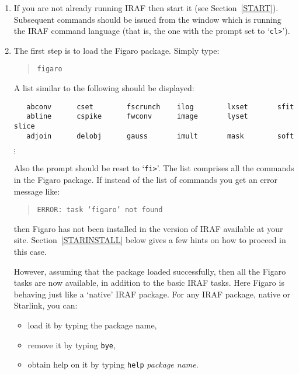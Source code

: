 \documentclass[twoside,11pt]{article}
\begin{document}
\begin{enumerate}

  \item If you are not already running IRAF then start it (see
   Section~\ref{START}).  Subsequent commands should be issued from
   the window which is running the IRAF command language (that is, the
   one with the prompt set to `\verb-cl>-').

  \item The first step is to load the Figaro package.  Simply type:

  \begin{quote}
   {\tt figaro}
  \end{quote}

   A list similar to the following should be displayed:

  \begin{center}
  \begin{verbatim}
   abconv      cset        fscrunch    ilog        lxset       sfit
   abline      cspike      fwconv      image       lyset       slice
   adjoin      delobj      gauss       imult       mask        soft
\end{verbatim}$\vdots$\end{center}

   Also the prompt should be reset to `\verb-fi>-'.  The list comprises
   all the commands in the Figaro package.  If instead of the list of
   commands you get an error message like:

  \begin{quote}
   {\tt ERROR: task `figaro' not found}
  \end{quote}

   then Figaro has not been installed in the version of IRAF available
   at your site.  Section~\ref{STARINSTALL} below gives a few hints on
   how to proceed in this case.

   However, assuming that the package loaded successfully, then all the
   Figaro tasks are now available, in addition to the basic IRAF tasks.
   Here Figaro is behaving just like a `native' IRAF package.  For any
   IRAF package, native or Starlink, you can:

  \begin{itemize}

    \item load it by typing the package name,

    \item remove it by typing {\tt bye},

    \item obtain help on it by typing {\tt help} {\it package name}.


\end{itemize}
\end{enumerate}
\end{document}
